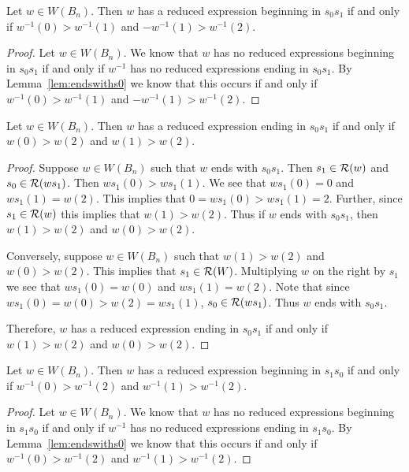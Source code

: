 \begin{corollary}\label{lem:beginswiths0}
	Let $w \in W(B_n)$. Then $w$ has a reduced expression beginning in $s_0s_1$ if and only if $w^{-1}(0)>w^{-1}(1)$ and $-w^{-1}(1)>w^{-1}(2)$.
	\begin{proof}
		Let $w \in W(B_n)$. We know that $w$ has no reduced expressions beginning in $s_0s_1$ if and only if $w^{-1}$ has no reduced expressions ending in $s_0s_1$. By Lemma~\ref{lem:endswiths0} we know that this occurs if and only if $w^{-1}(0)>w^{-1}(1)$ and $-w^{-1}(1)>w^{-1}(2)$.
	\end{proof}
\end{corollary}

\begin{lemma}\label{lem:endswiths_1}
Let $w \in W(B_n)$. Then $w$ has a reduced expression ending in $s_0s_1$ if and only if $w(0)>w(2)$ and $w(1)>w(2)$.
\begin{proof}
	Suppose $w \in W(B_n)$ such that $w$ ends with $s_0s_1$. Then $s_1 \in \mathcal{R}(w)$ and $s_0 \in \mathcal{R}(ws_1)$. Then $ws_1(0)>ws_1(1)$. We see that $ws_1(0)=0$ and $ws_1(1)=w(2)$. This implies that $0=ws_1(0)>ws_1(1)=2$. Further, since $s_1 \in \mathcal{R}(w)$ this implies that $w(1) > w(2)$. Thus if $w$ ends with $s_0s_1$, then $w(1)>w(2)$ and $w(0)>w(2)$.
	
	Conversely, suppose $w \in W(B_n)$ such that $w(1)>w(2)$ and $w(0)>w(2)$. This implies that $s_1 \in \mathcal{R}(W)$. Multiplying $w$ on the right by $s_1$ we see that $ws_1(0)=w(0)$ and $ws_1(1)=w(2)$. Note that since $ws_1(0)=w(0)>w(2)=ws_1(1)$, $s_0 \in \mathcal{R}(ws_1)$. Thus $w$ ends with $s_0s_1$. 
	
	Therefore, $w$ has a reduced expression ending in $s_0s_1$ if and only if $w(1)>w(2)$ and $w(0)>w(2)$.
\end{proof}	
\end{lemma}

\begin{corollary}\label{lem:beginswiths1}
	Let $w \in W(B_n)$. Then $w$ has a reduced expression beginning in $s_1s_0$ if and only if $w^{-1}(0)>w^{-1}(2)$ and $w^{-1}(1)>w^{-1}(2)$.
	\begin{proof}
		Let $w \in W(B_n)$. We know that $w$ has no reduced expressions beginning in $s_1s_0$ if and only if $w^{-1}$ has no reduced expressions ending in $s_1s_0$. By Lemma~\ref{lem:endswiths0} we know that this occurs if and only if $w^{-1}(0)>w^{-1}(2)$ and $w^{-1}(1)>w^{-1}(2)$.
	\end{proof}
\end{corollary}

